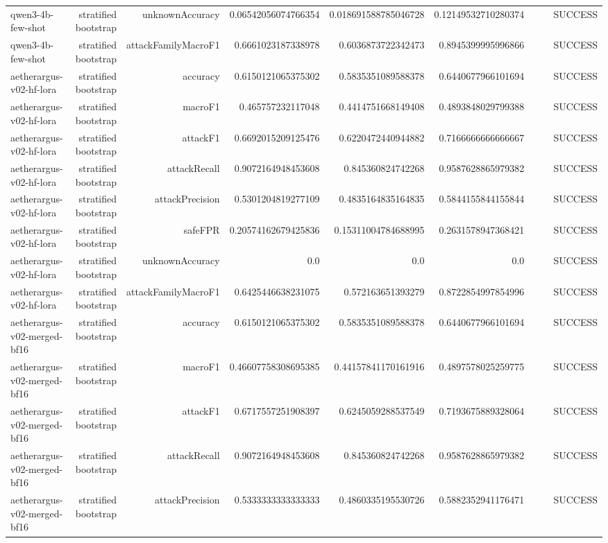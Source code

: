 \begin{table}[t]
\begin{tabular}{lrrrrrrrr}
qwen3-4b-few-shot & stratified bootstrap & unknownAccuracy & 0.06542056074766354 & 0.018691588785046728 & 0.12149532710280374 &  &  & SUCCESS \\
qwen3-4b-few-shot & stratified bootstrap & attackFamilyMacroF1 & 0.6661023187338978 & 0.6036873722342473 & 0.8945399995996866 &  &  & SUCCESS \\
aetherargus-v02-hf-lora & stratified bootstrap & accuracy & 0.6150121065375302 & 0.5835351089588378 & 0.6440677966101694 &  &  & SUCCESS \\
aetherargus-v02-hf-lora & stratified bootstrap & macroF1 & 0.465757232117048 & 0.4414751668149408 & 0.4893848029799388 &  &  & SUCCESS \\
aetherargus-v02-hf-lora & stratified bootstrap & attackF1 & 0.6692015209125476 & 0.6220472440944882 & 0.7166666666666667 &  &  & SUCCESS \\
aetherargus-v02-hf-lora & stratified bootstrap & attackRecall & 0.9072164948453608 & 0.845360824742268 & 0.9587628865979382 &  &  & SUCCESS \\
aetherargus-v02-hf-lora & stratified bootstrap & attackPrecision & 0.5301204819277109 & 0.4835164835164835 & 0.5844155844155844 &  &  & SUCCESS \\
aetherargus-v02-hf-lora & stratified bootstrap & safeFPR & 0.20574162679425836 & 0.15311004784688995 & 0.2631578947368421 &  &  & SUCCESS \\
aetherargus-v02-hf-lora & stratified bootstrap & unknownAccuracy & 0.0 & 0.0 & 0.0 &  &  & SUCCESS \\
aetherargus-v02-hf-lora & stratified bootstrap & attackFamilyMacroF1 & 0.6425446638231075 & 0.572163651393279 & 0.8722854997854996 &  &  & SUCCESS \\
aetherargus-v02-merged-bf16 & stratified bootstrap & accuracy & 0.6150121065375302 & 0.5835351089588378 & 0.6440677966101694 &  &  & SUCCESS \\
aetherargus-v02-merged-bf16 & stratified bootstrap & macroF1 & 0.46607758308695385 & 0.44157841170161916 & 0.4897578025259775 &  &  & SUCCESS \\
aetherargus-v02-merged-bf16 & stratified bootstrap & attackF1 & 0.6717557251908397 & 0.6245059288537549 & 0.7193675889328064 &  &  & SUCCESS \\
aetherargus-v02-merged-bf16 & stratified bootstrap & attackRecall & 0.9072164948453608 & 0.845360824742268 & 0.9587628865979382 &  &  & SUCCESS \\
aetherargus-v02-merged-bf16 & stratified bootstrap & attackPrecision & 0.5333333333333333 & 0.4860335195530726 & 0.5882352941176471 &  &  & SUCCESS \\

\end{tabular}
\end{table}
